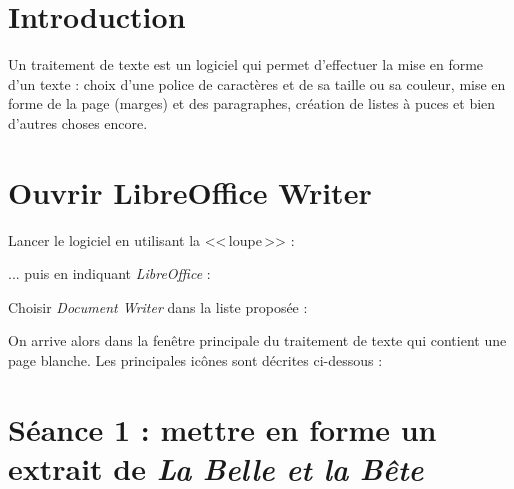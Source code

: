 \section{Introduction} 

Un traitement de texte est un logiciel qui permet d'effectuer la mise en forme d'un texte : choix d'une police de caractères et de sa taille ou sa couleur, mise en forme de la page (marges) et des paragraphes, création de listes à puces et bien d'autres choses encore.




\section{Ouvrir LibreOffice Writer}

Lancer le logiciel en utilisant la <<\,loupe\,>> :


... puis en indiquant \emph{LibreOffice} :


Choisir \emph{Document Writer} dans la liste proposée :


On arrive alors dans la fenêtre principale du traitement de texte qui contient une page blanche. Les principales icônes sont décrites ci-dessous :





%
%
%
%




\section{Séance 1 : mettre en forme un extrait de \emph{La Belle et la Bête}}

